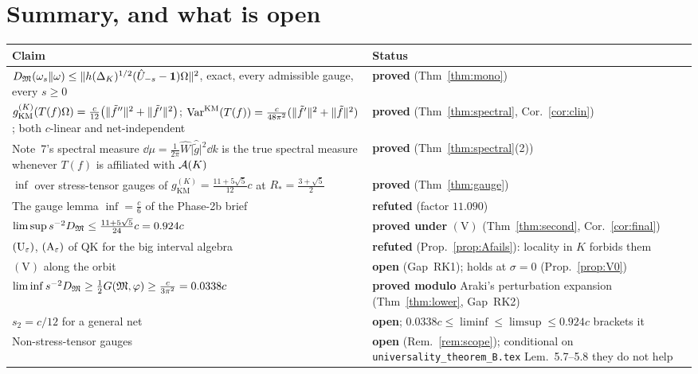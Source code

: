 \documentclass[11pt]{article}
\newcommand{\abs}[1]{\lvert#1\rvert}
\newcommand{\gKM}{g_{\mathrm{KM}}}\newcommand{\gB}{g_{\mathrm B}}
\begin{document}
\section{Summary, and what is open}\label{sec:open}

\begin{center}\small
\begin{tabular}{@{}p{}p{}@{}}\toprule
\textbf{Claim} & \textbf{Status}\\\midrule
$D_{\mathfrak M}(\omega_s\Vert\omega)\le\lVert h(\Delta_K)^{1/2}(\hat U_{-s}-\mathbf 1)\Omega\rVert^2$, exact, every admissible
 gauge, every $s\ge0$ & \textbf{proved} (Thm~\ref{thm:mono})\\
$\gKM^{(K)}(T(f)\Om)=\frac c{12}\bigl(\norm{\tilde f''}^2+\norm{\tilde f'}^2\bigr)$;
 $\operatorname{Var}^{\mathrm{KM}}(T(f))=\frac c{48\pi^2}(\lVert\tilde f'\rVert^2+\lVert\tilde f\rVert^2)$; both $c$-linear and
 net-independent & \textbf{proved} (Thm~\ref{thm:spectral}, Cor.~\ref{cor:clin})\\
Note~7's spectral measure $\dd\mu=\frac1{2\pi}\hat W\abs{\hat{\tilde g}}^2\dd k$ is the true spectral
 measure whenever $T(f)$ is affiliated with $\mathcal A(K)$ & \textbf{proved} (Thm~\ref{thm:spectral}(2))\\
$\inf$ over stress-tensor gauges of $\gKM^{(K)}=\frac{11+5\sqrt5}{12}c$ at $R_*=\frac{3+\sqrt5}2$
 & \textbf{proved} (Thm~\ref{thm:gauge})\\
The gauge lemma $\inf=\frac c6$ of the Phase-2b brief & \textbf{refuted} (factor $11.090$)\\
$\limsup s^{-2}D_{\mathfrak M}\le\frac{11+5\sqrt5}{24}c=0.924c$ & \textbf{proved under} $(\mathrm V)$
 (Thm~\ref{thm:second}, Cor.~\ref{cor:final})\\
$(\mathrm U_\varepsilon)$, $(\mathrm A_\varepsilon)$ of QK for the big interval algebra & \textbf{refuted}
 (Prop.~\ref{prop:Afails}): locality in $K$ forbids them\\
$(\mathrm V)$ along the orbit & \textbf{open} (Gap~RK1); holds at $\sigma=0$ (Prop.~\ref{prop:V0})\\
$\liminf s^{-2}D_{\mathfrak M}\ge\frac12G(\mathfrak M,\varphi)\ge\frac c{3\pi^2}=0.0338c$ & \textbf{proved modulo}
 Araki's perturbation expansion (Thm~\ref{thm:lower}, Gap~RK2)\\
$s_2=c/12$ for a general net & \textbf{open}; $0.0338c\le\liminf\le\limsup\le0.924c$ brackets it\\
Non-stress-tensor gauges & \textbf{open} (Rem.~\ref{rem:scope}); conditional on
 \texttt{universality\_theorem\_B.tex} Lem.~5.7--5.8 they do not help\\\bottomrule
\end{tabular}
\end{center}
\end{document}
